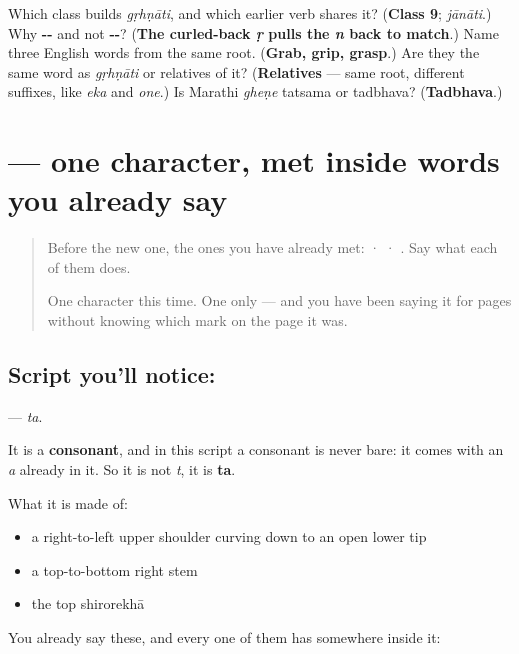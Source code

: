 \begin{tcolorbox}[breakable,colback=teal!4,colframe=teal!35!black,title={Before you move on}]
Which class builds \emph{gṛhṇāti}, and which earlier verb shares it? (\textbf{Class 9}; \emph{jānāti}.) Why \textbf{--} and not \textbf{--}? (\textbf{The curled-back \emph{ṛ} pulls the \emph{n} back to match}.) Name three English words from the same root. (\textbf{Grab, grip, grasp}.) Are they the same word as \emph{gṛhṇāti} or relatives of it? (\textbf{Relatives} — same root, different suffixes, like \emph{eka} and \emph{one}.) Is Marathi \emph{gheṇe} tatsama or tadbhava? (\textbf{Tadbhava}.)
\end{tcolorbox}
\section[\texorpdfstring{\sk{त} (ta)}{त (ta)}]{ — one character, met inside words you already say}

\label{lesson:SA-S107-letter-ta}



\begin{quote}
Before the new one, the ones you have already met:  ·  · . Say what each of them does.

One character this time. One only — and you have been saying it for pages without knowing which mark on the page it was.
\end{quote}

\subsection*{Script you'll notice: }
\textbf{} — \emph{ta}.

It is a \textbf{consonant}, and in this script a consonant is never bare: it comes with an \emph{a} already in it. So it is not \emph{t}, it is \textbf{ta}.

What it is made of:

\begin{itemize}
\raggedright
  \item a right-to-left upper shoulder curving down to an open lower tip
  \item a top-to-bottom right stem
  \item the top shirorekhā
\end{itemize}

You already say these, and every one of them has  somewhere inside it:

